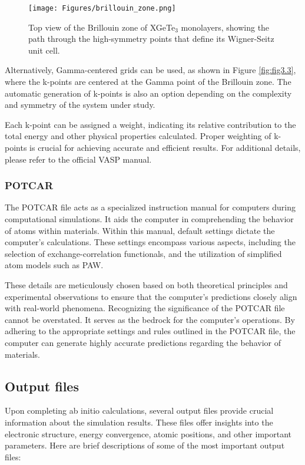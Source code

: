 \begin{figure}[H]
	\centering
	\texttt{[image: Figures/brillouin\_zone.png]}
	\caption{Top view of the Brillouin zone of XGeTe$_{3}$ monolayers, showing the path through the high-symmetry points that define its Wigner-Seitz unit cell.}
	\label{fig:brillouin_zone}
\end{figure}

Alternatively, Gamma-centered grids can be used, as shown in Figure \ref{fig:fig3.3}, where the k-points are centered at the Gamma point of the Brillouin zone. The automatic generation of k-points is also an option depending on the complexity and symmetry of the system under study.

Each k-point can be assigned a weight, indicating its relative contribution to the total energy and other physical properties calculated. Proper weighting of k-points is crucial for achieving accurate and efficient results. For additional details, please refer to the official VASP manual\supercite{KPOINTS}.
\subsubsection{POTCAR}
The POTCAR file acts as a specialized instruction manual for computers during computational simulations. It aids the computer in comprehending the behavior of atoms within materials. Within this manual, default settings dictate the computer's calculations. These settings encompass various aspects, including the selection of exchange-correlation functionals, and the utilization of simplified atom models such as PAW.

These details are meticulously chosen based on both theoretical principles and experimental observations to ensure that the computer's predictions closely align with real-world phenomena. Recognizing the significance of the POTCAR file cannot be overstated. It serves as the bedrock for the computer's operations. By adhering to the appropriate settings and rules outlined in the POTCAR file, the computer can generate highly accurate predictions regarding the behavior of materials.

\subsection{Output files}
Upon completing ab initio calculations, several output files provide crucial information about the simulation results. These files offer insights into the electronic structure, energy convergence, atomic positions, and other important parameters. Here are brief descriptions of some of the most important output files:

